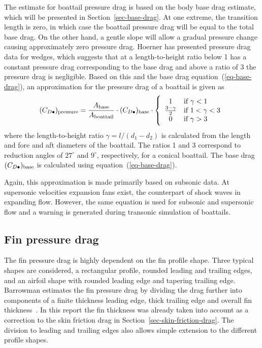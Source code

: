 The estimate for boattail pressure drag is based on the body base
drag estimate, which will be presented in Section~\ref{sec-base-drag}.
At one extreme, the transition length is zero, in which case the
boattail pressure drag will be equal to the total base drag.  On the
other hand, a gentle slope will allow a gradual pressure change
causing approximately zero pressure drag.  Hoerner has presented
pressure drag data for wedges, which suggests that at a
length-to-height ratio below 1 has a constant pressure drag
corresponding to the base drag and above a ratio of 3 the pressure
drag is negligible.  Based on this and the base drag
equation~(\ref{eq-base-drag}), an approximation for the pressure drag
of a boattail is given as
%
\begin{equation}
(C_{D\bullet})_{\rm pressure} =
\frac{A_{\rm base}}{A_{\rm boattail}} \cdot (C_{D\bullet})_{\rm base}
\cdot 
\left\{
\begin{array}{cl}
1 & \mbox{if\ } \gamma < 1 \\
\frac{3-\gamma}{2} & \mbox{if\ } 1 < \gamma < 3 \\
0 & \mbox{if\ } \gamma > 3
\end{array}
\right.
\end{equation}
%
where the length-to-height ratio $\gamma = l/(d_1-d_2)$ is calculated
from the length and fore and aft diameters of the boattail.  The
ratios 1 and 3 correspond to reduction angles of $27^\circ$ and
$9^\circ$, respectively, for a conical boattail.  The base drag
$(C_{D\bullet})_{\rm base}$ is calculated using
equation~(\ref{eq-base-drag}).

Again, this approximation is made primarily based on subsonic data.
At supersonic velocities expansion fans exist, the counterpart of
shock waves in expanding flow.  However, the same equation is used for
subsonic and supersonic flow and a warning is generated during
transonic simulation of boattails.



\subsection{Fin pressure drag}

The fin pressure drag is highly dependent on the fin profile shape.
Three typical shapes are considered, a rectangular profile, rounded
leading and trailing edges, and an airfoil shape with rounded leading
edge and tapering trailing edge.  Barrowman estimates the fin pressure
drag by dividing the drag further into components of a finite
thickness leading edge, thick trailing edge and overall fin
thickness~\cite[p.~48--57]{barrowman-thesis}.  In this report the fin
thickness was already taken into account as a correction to the skin
friction drag in Section~\ref{sec-skin-friction-drag}.  The division
to leading and trailing edges also allows simple extension to the
different profile shapes.

